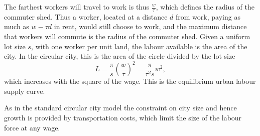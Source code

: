 
The farthest workers will travel to work is thus $\frac{w}{\tau}$, which defines the radius of the commuter shed. Thus a worker, located at a distance $d$ from work, paying as much as $w-\tau d$ in rent, would still choose to work, and the maximum distance that workers will commute is the radius of the commuter shed. Given a uniform lot size $s$, with one worker per unit land, the labour available is the area of the city. In the circular city, this is the area of the circle divided by the lot size
\begin{equation}
                 L%
			=\frac{\pi}{s}  \left(\frac{w}{\tau}\right)^2
			=\frac{\pi}{\tau^2 s} w^2, \label{Eqn:LabourSupply}
\end{equation}
which increases with the square of the wage. This is the equilibrium urban labour supply curve.

As in the standard circular city model the constraint on city size and hence growth is provided by transportation costs, which limit the size of the labour force at any wage. 



